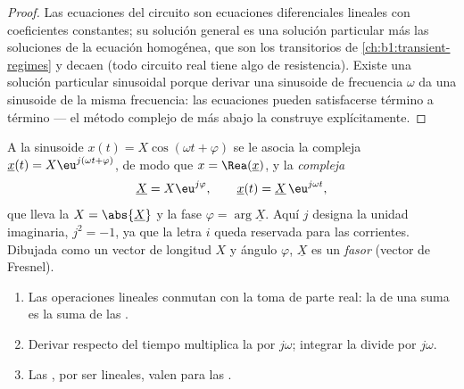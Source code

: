\begin{proof}
Las ecuaciones del circuito son ecuaciones diferenciales lineales con
coeficientes constantes; su solución general es una solución particular
más las soluciones de la ecuación homogénea, que son los transitorios de
\cref{ch:b1:transient-regimes} y decaen (todo circuito real tiene algo de
resistencia). Existe una solución particular sinusoidal porque derivar
una sinusoide de frecuencia $\omega$ da una sinusoide de la misma
frecuencia: las ecuaciones pueden satisfacerse término a término --- el
método complejo de más abajo la construye explícitamente.
\end{proof}

\begin{definition}\label{def:b1:sinusoidal-impedance:complex}
A la sinusoide $x(t) = X\cos(\omega t + \varphi)$ se le asocia la 
compleja $\underline{x}(t) = X\eu^{j(\omega t + \varphi)}$, de modo que
$x = \Rea(\underline{x})$, y la \emph{ compleja}
\[
\underline{X} = X\eu^{j\varphi}, \qquad \underline{x}(t) = \underline{X}\,\eu^{j\omega t},
\]
que lleva la  $X = \abs{\underline{X}}$ y la fase
$\varphi = \arg\underline{X}$. Aquí $j$ designa la unidad imaginaria,
$j^2 = -1$, ya que la letra $i$ queda reservada para las corrientes.
Dibujada como un vector de longitud $X$ y ángulo $\varphi$,
$\underline{X}$ es un \emph{fasor} (vector de Fresnel).
\end{definition}

\begin{proposition}\label{prop:b1:sinusoidal-impedance:rules}
\begin{enumerate}
  \item Las operaciones lineales conmutan con la toma de parte real: la
         de una suma es la suma de las .
  \item Derivar respecto del tiempo multiplica la  por
        $j\omega$; integrar la divide por $j\omega$.
  \item Las , por ser lineales, valen para las
        .
\end{enumerate}
\end{proposition}

